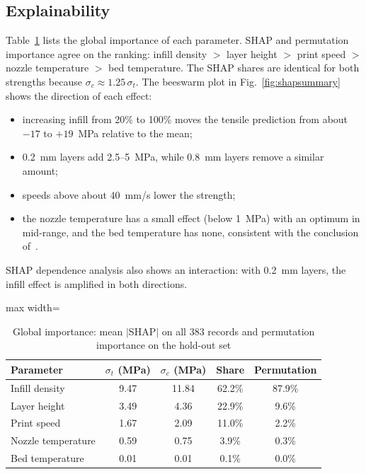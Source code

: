 \documentclass[conference,12pt]{IEEEtran}
\newcommand{\st}{\ensuremath{\sigma_t}}
\newcommand{\sco}{\ensuremath{\sigma_c}}
\begin{document}
\subsection{Explainability}
Table~\ref{tab:shap} lists the global importance of each parameter. SHAP and permutation importance agree on the ranking: infill density $>$ layer height $>$ print speed $>$ nozzle temperature $>$ bed temperature. The SHAP shares are identical for both strengths because $\sigma_c \approx 1.25\,\sigma_t$. The beeswarm plot in Fig.~\ref{fig:shapsummary} shows the direction of each effect:
\begin{itemize}
\item increasing infill from 20\% to 100\% moves the tensile prediction from about $-17$ to $+19$~MPa relative to the mean;
\item 0.2~mm layers add 2.5--5~MPa, while 0.8~mm layers remove a similar amount;
\item speeds above about 40~mm/s lower the strength;
\item the nozzle temperature has a small effect (below 1~MPa) with an optimum in mid-range, and the bed temperature has none, consistent with the conclusion of~\cite{munshi2026}.
\end{itemize}
SHAP dependence analysis also shows an interaction: with 0.2~mm layers, the infill effect is amplified in both directions.

\begin{table}[!t]
\caption{Global importance: mean $|$SHAP$|$ on all 383 records and permutation importance on the hold-out set}
\label{tab:shap}
\centering
\setlength{\tabcolsep}{4pt}
\begin{adjustbox}{max width=\columnwidth}
\begin{tabular}{@{}lcccc@{}}
\toprule
Parameter & \st{} (MPa) & \sco{} (MPa) & Share & Permutation \\
\midrule
Infill density & 9.47 & 11.84 & 62.2\% & 87.9\% \\
Layer height & 3.49 & 4.36 & 22.9\% & 9.6\% \\
Print speed & 1.67 & 2.09 & 11.0\% & 2.2\% \\
Nozzle temperature & 0.59 & 0.75 & 3.9\% & 0.3\% \\
Bed temperature & 0.01 & 0.01 & 0.1\% & 0.0\% \\
\bottomrule
\end{tabular}
\end{adjustbox}
\end{table}
\end{document}
